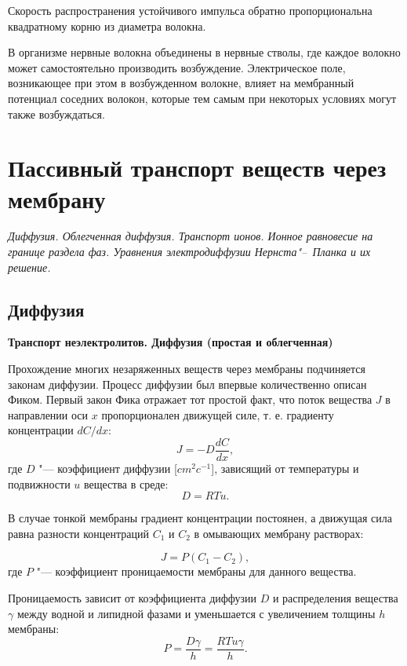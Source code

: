 \documentclass[12pt,a4paper,oneside]{book}
\begin{document}
Скорость распространения устойчивого импульса обратно пропорциональна квадратному корню из диаметра волокна.

В организме нервные волокна объединены в нервные стволы, где каждое волокно может самостоятельно производить возбуждение. Электрическое поле, возникающее при этом в возбужденном волокне, влияет на мембранный потенциал соседних волокон, которые тем самым при некоторых условиях могут также возбуждаться. 




\newpage
\section{Пассивный транспорт веществ через мембрану}
{\it Диффузия. Облегченная диффузия. Транспорт ионов. Ионное равновесие на границе раздела фаз. Уравнения электродиффузии Нернста"--~Планка и их решение.}

\subsection{Диффузия}

{\bf Транспорт неэлектролитов. Диффузия (простая и облегченная)}

Прохождение многих незаряженных веществ через мембраны подчиняется законам диффузии. Процесс диффузии был впервые количественно описан Фиком. Первый закон Фика отражает тот простой факт, что поток вещества $J$ в направлении оси $x$ пропорционален движущей силе, т. е. градиенту концентрации $dC/dx$:
\begin{equation}
	J = -D\frac{dC}{dx},
\end{equation}
где $D$ "--- коэффициент диффузии [$cm^2c^{-1}$], зависящий от температуры и подвижности $u$ вещества в среде:
\begin{equation}
	D = RTu.
\end{equation}

В случае тонкой мембраны градиент концентрации постоянен, а движущая сила равна разности концентраций $C_1$ и $C_2$ в омывающих мембрану растворах:

\begin{equation}
	J=P(C_1-C_2),
\end{equation} 
где $P$ "--- коэффициент проницаемости мембраны для данного вещества.

Проницаемость зависит от коэффициента диффузии $D$ и распределения вещества $\gamma$ между водной и липидной фазами и уменьшается с увеличением толщины $h$ мембраны:
\begin{equation}
	P = \frac{D\gamma}{h} = \frac{RTu\gamma}{h}.
\end{equation}
\end{document}
